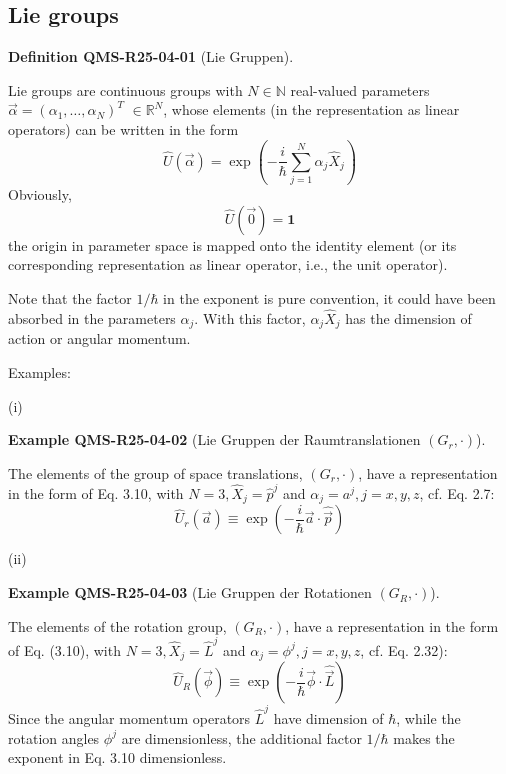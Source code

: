 \documentclass[10pt, letterpaper]{article}
\newcommand{\CustomHeading}[3]{%
  \par\medskip\noindent%
  \textbf{#1 #2} \textnormal{(#3)}.\enskip%
}
\newenvironment{DEF}[2]{\begin{unitbox}\CustomHeading{Definition}{#1}{#2}}{\end{unitbox}}
\newenvironment{EXA}[2]{\begin{unitbox}\CustomHeading{Example}{#1}{#2}}{\end{unitbox}}
\begin{document}
\pagebreak



\subsection{Lie groups}


\begin{DEF}{QMS-R25-04-01}{Lie Gruppen}
Lie groups are continuous groups with $N \in \mathbb{N}$ real-valued parameters $\vec{\alpha}=\left(\alpha_{1}, \ldots, \alpha_{N}\right)^{T}$ $\in \mathbb{R}^{N}$, whose elements (in the representation as linear operators) can be written in the form
$$
\hat{U}(\vec{\alpha})=\exp \left(-\frac{i}{\hbar} \sum_{j=1}^{N} \alpha_{j} \hat{X}_{j}\right)
$$
Obviously,
$$
\hat{U}(\overrightarrow{0})=\mathbf{1}
$$
the origin in parameter space is mapped onto the identity element (or its corresponding representation as linear operator, i.e., the unit operator). 

Note that the factor $1 / \hbar$ in the exponent is pure convention, it could have been absorbed in the parameters $\alpha_{j}$. With this factor, $\alpha_{j} \hat{X}_{j}$ has the dimension of action or angular momentum.
\end{DEF}



Examples:

(i) 

\begin{EXA}{QMS-R25-04-02}{Lie Gruppen der Raumtranslationen $\left(G_{r}, \cdot\right)$}
The elements of the group of space translations, $\left(G_{r}, \cdot\right)$, have a representation in the form of Eq. 3.10, with $N=3, \hat{X}_{j}=\hat{p}^{j}$ and $\alpha_{j}=a^{j}, j=x, y, z$, cf. Eq. 2.7:
$$\hat{U}_r(\vec{a}) \equiv \exp \left(-\frac{i}{\hbar} \vec{a} \cdot \hat{\vec{p}}\right)$$
\end{EXA}


(ii) 

\begin{EXA}{QMS-R25-04-03}{Lie Gruppen der Rotationen $\left(G_{R}, \cdot\right)$}
The elements of the rotation group, $\left(G_{R}, \cdot\right)$, have a representation in the form of Eq. (3.10), with $N=3, \hat{X}_{j}=\hat{L}^{j}$ and $\alpha_{j}=\phi^{j}, j=x, y, z$, cf. Eq. 2.32):
$$\hat{U}_R(\vec{\phi}) \equiv \exp \left(-\frac{i}{\hbar} \vec{\phi} \cdot \hat{\vec{L}}\right)$$
Since the angular momentum operators $\hat{L}^{j}$ have dimension of $\hbar$, while the rotation angles $\phi^{j}$ are dimensionless, the additional factor $1 / \hbar$ makes the exponent in Eq. 3.10 dimensionless.
\end{EXA}
\end{document}
